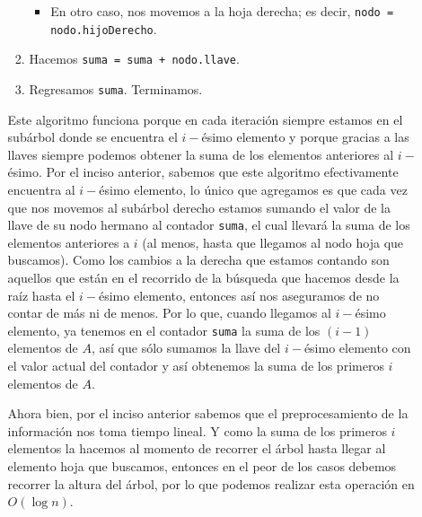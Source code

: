 \documentclass[letterpaper,11pt]{article}
\begin{document}
\begin{enumerate}
\begin{itemize}
\begin{enumerate}
\begin{itemize}
                \item En otro caso, nos movemos a la hoja derecha; es decir, 
                \texttt{nodo = nodo.hijoDerecho}.
            \end{itemize}

            \item Hacemos \texttt{suma = suma + nodo.llave}. 
            
            \item Regresamos \texttt{suma}. Terminamos.
        \end{enumerate}

        Este algoritmo funciona porque en cada iteración siempre estamos en el 
        subárbol donde se encuentra el $i-$ésimo elemento y porque gracias a 
        las llaves siempre podemos obtener la suma de los elementos anteriores 
        al $i-$ésimo. Por el inciso anterior, sabemos que este algoritmo 
        efectivamente encuentra al $i-$ésimo elemento, lo único que agregamos
        es que cada vez que nos movemos al subárbol derecho estamos sumando 
        el valor de la llave de su nodo hermano al contador \texttt{suma}, el 
        cual llevará la suma de los elementos anteriores a $i$ (al menos, 
        hasta que llegamos al nodo hoja que buscamos). Como los cambios a la
        derecha que estamos contando son aquellos que están en el recorrido de
        la búsqueda que hacemos desde la raíz hasta el $i-$ésimo elemento, 
        entonces así nos aseguramos de no contar de más ni de menos. Por lo que, 
        cuando llegamos al $i-$ésimo elemento, ya tenemos en el contador 
        \texttt{suma} la suma de los $(i-1)$ elementos de $A$, así que sólo 
        sumamos la llave del $i-$ésimo elemento con el valor actual del 
        contador y así obtenemos la suma de los primeros $i$ elementos de $A$.

        Ahora bien, por el inciso anterior sabemos que el preprocesamiento de 
        la información nos toma tiempo lineal. Y como la suma de los primeros 
        $i$ elementos la hacemos al momento de recorrer el árbol hasta llegar 
        al elemento hoja que buscamos, entonces en el peor de los casos debemos 
        recorrer la altura del árbol, por lo que podemos realizar esta 
        operación en $O(\log n)$.


\end{itemize}
\end{enumerate}
\end{document}
